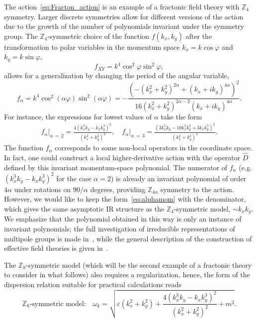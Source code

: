 \documentclass[a4paper,12pt]{article}
\newcommand{\be}{\begin{equation}}
\newcommand{\ee}{\end{equation}}
\newcommand{\eps}{\varepsilon}
\newcommand{\Z}[1]{\mathbb{Z}_{#1}}
\begin{document}
The action~\eqref{eq:Fracton_action} is an example of a fractonic field theory with $\Z4$ symmetry. Larger discrete symmetries allow for different versions of the action due to the growth of the number of polynomials invariant under the symmetry group. The $\Z4$-symmetric choice of the function $f(k_x, k_y)$ after the transformation to polar variables in the momentum space $k_x = k\cos\varphi$ and $k_y = k\sin\varphi$,
\be 
    f_{XY} = k^4 \cos^2\varphi \sin^2\varphi,
\ee 
allows for a generalization by changing the period of the angular variable,
\be
    f_\alpha = k^4 \cos^2(\alpha\varphi) \sin^2(\alpha\varphi) = -\frac{\left(-\left(k_x^2 + k_y^2\right)^{2\alpha} + \left(k_x + i k_y\right)^{4\alpha}\right)^2}{16\left(k_x^2 + k_y^2\right)^{2\alpha - 2}\left(k_x + i k_y\right)^{4\alpha}}.
    \label{eq:alphamom}
\ee
For instance, the expressions for lowest values of $\alpha$ take the form
\begin{gather} 
    f_\alpha\Big\rvert_{\alpha\,=\,2} = \frac{4\left(k_x^3 k_y - k_x k_y^3\right)^2}{\left(k_x^2 + k_y^2\right)^2}, \quad f_\alpha\Big\rvert_{\alpha\,=\,3} = \frac{\left(3 k_x^5 k_y - 10 k_x^3 k_y^3 + 3 k_x k_y^5\right)^2}{\left(k_x^2 + k_y^2\right)^4}.
\end{gather}
The function $f_\alpha$ corresponds to some non-local operators in the coordinate space. In fact, one could construct a local higher-derivative action with the operator $\hat{D}$ defined by this invariant momentum-space polynomial. The numerator of $f_\alpha$ (e.g. $(k_x^3 k_y - k_x k_y^3)^2$ for the case $\alpha = 2$) is already an invariant polynomial of order $4\alpha$ under rotations on $90/\alpha$ degrees, providing $\Z{4\alpha}$ symmetry to the action. However, we would like to keep the form~\eqref{eq:alphamom} with the denominator, which gives the same asymptotic IR structure as the $\Z4$-symmetric model, $\sim k_xk_y$. We emphasize that the polynomial obtained in this way is only an instance of invariant polynomials; the full investigation of irreducible representations of multipole groups is made in~\cite{Bulmash:2023msp}, while the general description of the construction of effective field theories is given in~\cite{Gromov2019towards}.

The $\Z8$-symmetric model (which will be the second example of a fractonic theory to consider in what follows) also requires a regularization, hence, the form of the dispersion relation suitable for practical calculations reads
\be
    \Z8\text{-symmetric model:} \quad \omega_k = \sqrt{\eps(k_x^2 + k_y^2) + \frac{4(k_x^3 k_y - k_x k_y^3)^2}{(k_x^2 + k_y^2)^2} + m^2}.
    \label{eq:Z8disprel}
\ee
\end{document}
